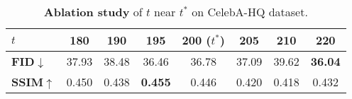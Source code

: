 \begin{table}[ht]
\small
\renewcommand\arraystretch{1}
\centering
\vspace{-8pt}
\caption{
    \textbf{Ablation study} of $t$ near $t^*$ on CelebA-HQ dataset.
}
\label{tab:ablation_t_star_celebahq}
\vspace{-10pt}
\begin{tabular}{l|ccccccc}
\toprule
$t$                 &   180 &   190 &       195 & 200 ($t^*$) &   205 &   210 &       220 \\
\midrule
\bf FID$\downarrow$ & 37.93 & 38.48 &     36.46 &       36.78 & 37.09 & 39.62 & \bf 36.04 \\
\bf SSIM$\uparrow$  & 0.450 & 0.438 & \bf 0.455 &       0.446 & 0.420 & 0.418 &     0.432 \\
\bottomrule
\end{tabular}
\end{table}